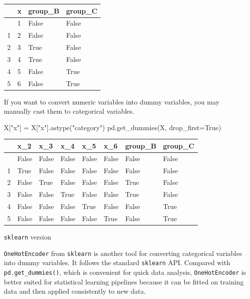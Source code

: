 \documentclass[
  letterpaper,
  DIV=11,
  numbers=noendperiod]{scrreprt}
\newenvironment{Shaded}{\begin{snugshade}}{\end{snugshade}}
\newcommand{\NormalTok}[1]{\textcolor[rgb]{0.00,0.23,0.31}{#1}}
\newcommand{\OperatorTok}[1]{\textcolor[rgb]{0.37,0.37,0.37}{#1}}
\newcommand{\StringTok}[1]{\textcolor[rgb]{0.13,0.47,0.30}{#1}}
\newcommand{\VariableTok}[1]{\textcolor[rgb]{0.07,0.07,0.07}{#1}}
\newcounter{none} %
\theoremstyle{definition}
\theoremstyle{definition}
\theoremstyle{plain}
\theoremstyle{plain}
\theoremstyle{remark}
\begin{document}
{\def\LTcaptype{none} %
\begin{longtable}[]{@{}llll@{}}
\toprule\noalign{}
& x & group\_B & group\_C \\
\midrule\noalign{}
\endhead
\bottomrule\noalign{}
\endlastfoot
0 & 1 & False & False \\
1 & 2 & False & False \\
2 & 3 & True & False \\
3 & 4 & True & False \\
4 & 5 & False & True \\
5 & 6 & False & True \\
\end{longtable}
}

If you want to convert numeric variables into dummy variables, you may
manually cast them to categorical variables.

\begin{Shaded}
\begin{Highlighting}[]
\NormalTok{X[}\StringTok{"x"}\NormalTok{] }\OperatorTok{=}\NormalTok{ X[}\StringTok{"x"}\NormalTok{].astype(}\StringTok{"category"}\NormalTok{)}
\NormalTok{pd.get\_dummies(X, drop\_first}\OperatorTok{=}\VariableTok{True}\NormalTok{)}
\end{Highlighting}
\end{Shaded}

{\def\LTcaptype{none} %
\begin{longtable}[]{@{}llllllll@{}}
\toprule\noalign{}
& x\_2 & x\_3 & x\_4 & x\_5 & x\_6 & group\_B & group\_C \\
\midrule\noalign{}
\endhead
\bottomrule\noalign{}
\endlastfoot
0 & False & False & False & False & False & False & False \\
1 & True & False & False & False & False & False & False \\
2 & False & True & False & False & False & True & False \\
3 & False & False & True & False & False & True & False \\
4 & False & False & False & True & False & False & True \\
5 & False & False & False & False & True & False & True \\
\end{longtable}
}

\texttt{sklearn} version

\texttt{OneHotEncoder} from \texttt{sklearn} is another tool for
converting categorical variables into dummy variables. It follows the
standard \texttt{sklearn} API. Compared with \texttt{pd.get\_dummies()},
which is convenient for quick data analysis, \texttt{OneHotEncoder} is
better suited for statistical learning pipelines because it can be
fitted on training data and then applied consistently to new data.
\end{document}
